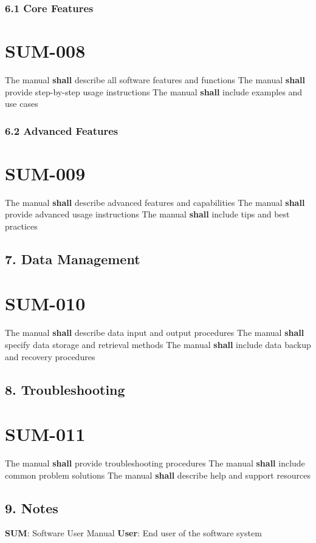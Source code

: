 \subsubsection{6.1 Core Features}

\section{SUM-008}\label{SUM-008}

The manual \textbf{shall} describe all software features and functions
The manual \textbf{shall} provide step-by-step usage instructions
The manual \textbf{shall} include examples and use cases

\subsubsection{6.2 Advanced Features}

\section{SUM-009}\label{SUM-009}

The manual \textbf{shall} describe advanced features and capabilities
The manual \textbf{shall} provide advanced usage instructions
The manual \textbf{shall} include tips and best practices

\subsection{7. Data Management}

\section{SUM-010}\label{SUM-010}

The manual \textbf{shall} describe data input and output procedures
The manual \textbf{shall} specify data storage and retrieval methods
The manual \textbf{shall} include data backup and recovery procedures

\subsection{8. Troubleshooting}

\section{SUM-011}\label{SUM-011}

The manual \textbf{shall} provide troubleshooting procedures
The manual \textbf{shall} include common problem solutions
The manual \textbf{shall} describe help and support resources

\subsection{9. Notes}
\textbf{SUM}: Software User Manual
\textbf{User}: End user of the software system

